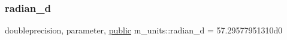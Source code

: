 \mbox{\label{namespacem__units_ae88c8fb74ff03da879e668cfe0635550}} 
\subsubsection{\texorpdfstring{radian\+\_\+d}{radian\_d}}
{\footnotesize\ttfamily doubleprecision, parameter, \hyperlink{M__stopwatch_83_8txt_a2f74811300c361e53b430611a7d1769f}{public} m\+\_\+units\+::radian\+\_\+d = 57.\+29577951310d0}

